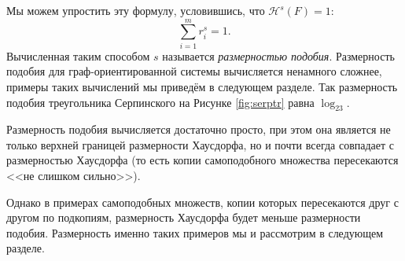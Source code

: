 \documentclass[a4paper,14pt]{extarticle} %
\newcommand{\cH}{\mathcal{H}}
\newcommand{\0}{\varnothing}
\newcommand{\8}{\infty}
\theoremstyle{definition}
\begin{document}
Мы можем упростить эту формулу, условившись, что $\cH^s(F)=1$:
\begin{equation}
    \sum_{i=1}^m r_i^s=1.
\end{equation}
Вычисленная таким способом $s$ называется {\em размерностью подобия}.
Размерность подобия для граф-ориентированной системы вычисляется ненамного сложнее, примеры таких вычислений мы приведём в следующем разделе.
Так размерность подобия треугольника Серпинского на Рисунке \ref{fig:serptr} равна $\log_23$.

Размерность подобия вычисляется достаточно просто, при этом она является не только верхней границей размерности Хаусдорфа, но и почти всегда совпадает с размерностью Хаусдорфа (то есть копии самоподобного множества пересекаются <<не слишком сильно>>).

Однако в примерах самоподобных множеств, копии которых пересекаются друг с другом по подкопиям, размерность Хаусдорфа будет меньше размерности подобия.
Размерность именно таких примеров мы и рассмотрим в следующем разделе.





\end{document}
